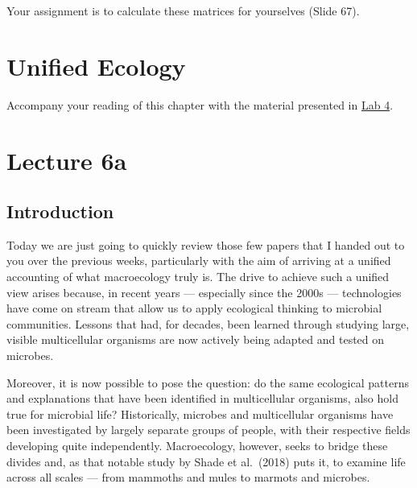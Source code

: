 \documentclass[
  11pt,
]{book}
\begin{document}
Your assignment is to calculate these matrices for yourselves (Slide
67).

\chapter{Unified Ecology}\label{unified-ecology}

\begin{tcolorbox}[enhanced jigsaw, arc=.35mm, titlerule=0mm, colframe=quarto-callout-note-color-frame, title=\textcolor{quarto-callout-note-color}{\faInfo}\hspace{0.5em}{Also see:}, colbacktitle=quarto-callout-note-color!10!white, opacityback=0, rightrule=.15mm, coltitle=black, left=2mm, bottomtitle=1mm, toptitle=1mm, toprule=.15mm, bottomrule=.15mm, leftrule=.75mm, opacitybacktitle=0.6, colback=white, breakable]

Accompany your reading of this chapter with the material presented in
\href{Lab-04-biodiversity}{Lab 4}.

\end{tcolorbox}

\chapter*{Lecture 6a}\label{lecture-6a}

\section{Introduction}\label{introduction-2}

Today we are just going to quickly review those few papers that I handed
out to you over the previous weeks, particularly with the aim of
arriving at a unified accounting of what macroecology truly is. The
drive to achieve such a unified view arises because, in recent years ---
especially since the 2000s --- technologies have come on stream that
allow us to apply ecological thinking to microbial communities. Lessons
that had, for decades, been learned through studying large, visible
multicellular organisms are now actively being adapted and tested on
microbes.

Moreover, it is now possible to pose the question: do the same
ecological patterns and explanations that have been identified in
multicellular organisms, also hold true for microbial life?
Historically, microbes and multicellular organisms have been
investigated by largely separate groups of people, with their respective
fields developing quite independently. Macroecology, however, seeks to
bridge these divides and, as that notable study by Shade et al.~(2018)
puts it, to examine life across all scales --- from mammoths and mules
to marmots and microbes.
\end{document}
